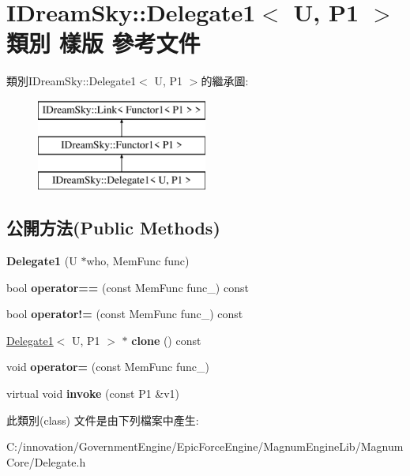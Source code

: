 \hypertarget{class_i_dream_sky_1_1_delegate1}{}\section{I\+Dream\+Sky\+:\+:Delegate1$<$ U, P1 $>$ 類別 樣版 參考文件}
\label{class_i_dream_sky_1_1_delegate1}
類別\+I\+Dream\+Sky\+:\+:Delegate1$<$ U, P1 $>$的繼承圖\+:\begin{figure}[H]
\begin{center}
\leavevmode
\includegraphics[height=3.000000cm]{class_i_dream_sky_1_1_delegate1}
\end{center}
\end{figure}
\subsection*{公開方法(Public Methods)}
\begin{DoxyCompactItemize}
\item 
{\bfseries Delegate1} (U $\ast$who, Mem\+Func func)\hypertarget{class_i_dream_sky_1_1_delegate1_abf903b3557c3aa127b918a9d80869ab9}{}\label{class_i_dream_sky_1_1_delegate1_abf903b3557c3aa127b918a9d80869ab9}

\item 
bool {\bfseries operator==} (const Mem\+Func func\+\_\+) const \hypertarget{class_i_dream_sky_1_1_delegate1_a4451293666e6fb3e9f7023765ab6efa4}{}\label{class_i_dream_sky_1_1_delegate1_a4451293666e6fb3e9f7023765ab6efa4}

\item 
bool {\bfseries operator!=} (const Mem\+Func func\+\_\+) const \hypertarget{class_i_dream_sky_1_1_delegate1_aba1520a01abb0138946e3486df421839}{}\label{class_i_dream_sky_1_1_delegate1_aba1520a01abb0138946e3486df421839}

\item 
\hyperlink{class_i_dream_sky_1_1_delegate1}{Delegate1}$<$ U, P1 $>$ $\ast$ {\bfseries clone} () const \hypertarget{class_i_dream_sky_1_1_delegate1_a35e6dc930fc758fef7d7db90091b9cae}{}\label{class_i_dream_sky_1_1_delegate1_a35e6dc930fc758fef7d7db90091b9cae}

\item 
void {\bfseries operator=} (const Mem\+Func func\+\_\+)\hypertarget{class_i_dream_sky_1_1_delegate1_aaf67b6a206cc4078d4a682eb523952e4}{}\label{class_i_dream_sky_1_1_delegate1_aaf67b6a206cc4078d4a682eb523952e4}

\item 
virtual void {\bfseries invoke} (const P1 \&v1)\hypertarget{class_i_dream_sky_1_1_delegate1_a93c2df6df337e8e61c23b3e2f667d16f}{}\label{class_i_dream_sky_1_1_delegate1_a93c2df6df337e8e61c23b3e2f667d16f}

\end{DoxyCompactItemize}


此類別(class) 文件是由下列檔案中產生\+:\begin{DoxyCompactItemize}
\item 
C\+:/innovation/\+Government\+Engine/\+Epic\+Force\+Engine/\+Magnum\+Engine\+Lib/\+Magnum\+Core/Delegate.\+h\end{DoxyCompactItemize}
